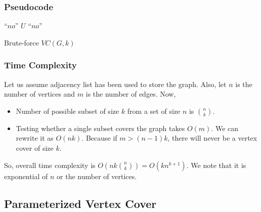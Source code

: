 \documentclass[12pt, a4paper]{article}
\begin{document}
	\subsubsection{Pseudocode}
	\begin{algorithm}[H]
		\SetAlgoLined
		\DontPrintSemicolon
		{
			\Return “$no$”
		}
		{   
			{
				\Return $U$\;
			}
		}
		\Return “$no$”
		\caption{Brute-force  $VC(G, k)$}
	\end{algorithm}
	\pagebreak
	\subsubsection{Time Complexity}
	Let us assume adjacency list has been used to store the graph. Also, let $n$ is the number of vertices and $m$ is the number of edges. Now,
	\begin{itemize}
		\item Number of possible subset of size $k$ from a set of size $n$ is $\binom{n}{k}.$
		\item Testing whether a single subset covers the graph takes $O(m)$. We can rewrite it as $O(n k)$. Because if $m > (n-1) k$, there will never be a vertex cover of size $k$.
	\end{itemize}
	So, overall time complexity is $O\left(nk\binom{n}{k}\right) = O\left(kn^{k+1}\right)$.
	We note that it is exponential of $n$ or the number of vertices.
	\subsection{Parameterized Vertex Cover}
\end{document}
